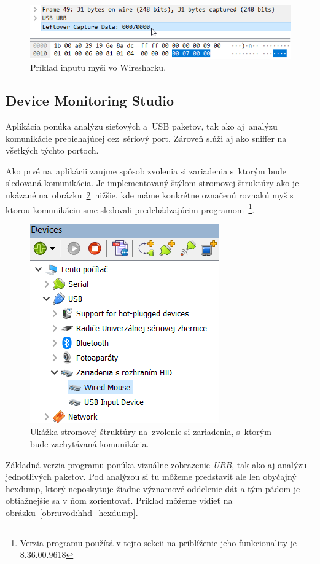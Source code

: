 \begin{figure}[!htb]
	\centering
	\includegraphics[width=12cm]{img/uvod_wireshark_input}
	\caption{Príklad inputu myši vo Wiresharku.}
	\label{obr:uvod:wireshark_input}
\end{figure}

\subsection*{Device Monitoring Studio}

Aplikácia ponúka analýzu sieťových a~USB paketov, tak ako aj~analýzu komunikácie prebiehajúcej cez~sériový port. Zároveň slúži aj ako sniffer na všetkých týchto portoch.

Ako prvé na~aplikácii zaujme spôsob zvolenia si zariadenia s~ktorým bude sledovaná komunikácia. Je implementovaný štýlom stromovej štruktúry ako je ukázané na~obrázku~\ref{obr:uvod:hhd_treeview_foto}~nižšie, kde máme konkrétne označenú rovnakú myš s ktorou komunikáciu sme sledovali predchádzajúcim programom~\footnote{Verzia programu použítá v tejto sekcii na priblíženie jeho funkcionality je 8.36.00.9618}. 

\begin{figure}[!htb]
	\centering
	\includegraphics{img/uvod_hhd_treeview}
	\caption{Ukážka stromovej štruktúry na~zvolenie si zariadenia, s~ktorým bude zachytávaná komunikácia.}
	\label{obr:uvod:hhd_treeview_foto}
\end{figure}
\newpage
Základná verzia programu ponúka vizuálne zobrazenie \textit{URB}, tak ako aj analýzu jednotlivých paketov.
Pod analýzou si tu môžeme predstaviť ale len obyčajný hexdump, ktorý neposkytuje žiadne významové oddelenie dát a tým pádom je obtiažnejšie sa v ňom zorientovať. Príklad môžeme vidieť na obrázku~\ref{obr:uvod:hhd_hexdump}.

